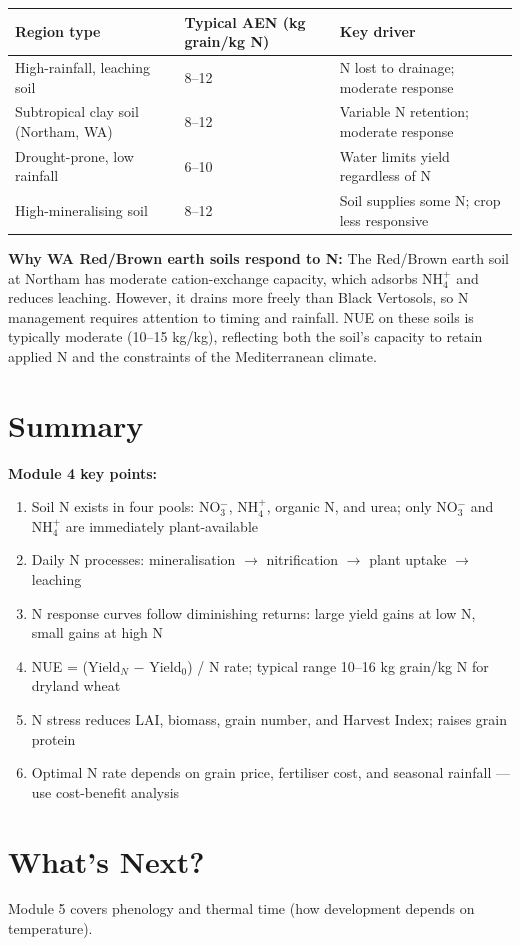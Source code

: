 \begin{center}
\begin{tabular}{l|l|l}
\textbf{Region type} & \textbf{Typical AEN (kg grain/kg N)} & \textbf{Key driver} \\
\hline
High-rainfall, leaching soil & 8--12 & N lost to drainage; moderate response \\
Subtropical clay soil (Northam, WA) & 8--12 & Variable N retention; moderate response \\
Drought-prone, low rainfall & 6--10 & Water limits yield regardless of N \\
High-mineralising soil & 8--12 & Soil supplies some N; crop less responsive \\
\end{tabular}
\end{center}

\begin{keyconceptbox}
\textbf{Why WA Red/Brown earth soils respond to N:}
The Red/Brown earth soil at Northam has moderate cation-exchange capacity, which adsorbs NH$_4^+$ and reduces leaching. However, it drains more freely than Black Vertosols, so N management requires attention to timing and rainfall. NUE on these soils is typically moderate (10--15 kg/kg), reflecting both the soil's capacity to retain applied N and the constraints of the Mediterranean climate.
\end{keyconceptbox}

\section{Summary}

\begin{keyconceptbox}
\textbf{Module 4 key points:}
\begin{enumerate}
  \item Soil N exists in four pools: NO$_3^-$, NH$_4^+$, organic N, and urea; only NO$_3^-$ and NH$_4^+$ are immediately plant-available
  \item Daily N processes: mineralisation $\to$ nitrification $\to$ plant uptake $\to$ leaching
  \item N response curves follow diminishing returns: large yield gains at low N, small gains at high N
  \item NUE = (Yield$_{N}$ $-$ Yield$_0$) / N rate; typical range 10--16 kg grain/kg N for dryland wheat
  \item N stress reduces LAI, biomass, grain number, and Harvest Index; raises grain protein
  \item Optimal N rate depends on grain price, fertiliser cost, and seasonal rainfall --- use cost-benefit analysis
\end{enumerate}
\end{keyconceptbox}

\section{What's Next?}

Module 5 covers phenology and thermal time (how development depends on temperature).

